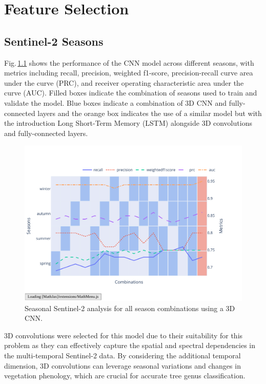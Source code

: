 \chapter{Feature Selection}
\label{chapter:analysis}

\section{Sentinel-2 Seasons}
\label{section:seasonal}

Fig.\,\ref{fig:seasonal_selection} shows the performance of the CNN model across different seasons, with metrics including recall, precision, weighted f1-score, precision-recall curve area under the curve (PRC), and receiver operating characteristic area under the curve (AUC). Filled boxes indicate the combination of seasons used to train and validate the model. Blue boxes indicate a combination of 3D CNN and fully-connected layers and the orange box indicates the use of a similar model but with the introduction Long Short-Term Memory (LSTM) alongside 3D convolutions and fully-connected layers.

\begin{figure}[ht]
    \centering
    \includegraphics[width=0.98\linewidth, trim={20pt 40pt 10pt 30pt}, clip]{figures/figures_analysis/seasonal_selection.pdf}
    \caption{Seasonal Sentinel-2 analysis for all season combinations using a 3D CNN.}
    \label{fig:seasonal_selection}
\end{figure}

3D convolutions were selected for this model due to their suitability for this problem as they can effectively capture the spatial and spectral dependencies in the multi-temporal Sentinel-2 data. By considering the additional temporal dimension, 3D convolutions can leverage seasonal variations and changes in vegetation phenology, which are crucial for accurate tree genus classification.

